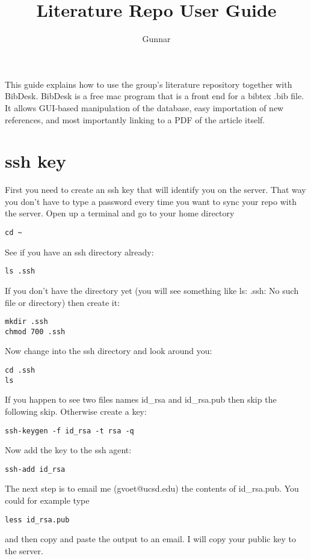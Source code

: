 \documentclass[11pt, oneside]{article}   	%
\title{Literature Repo User Guide}
\author{Gunnar}
\begin{document}
\maketitle

This guide explains how to use the group's literature repository together with BibDesk. BibDesk is a free mac program that is a front end for a bibtex .bib file.  It allows GUI-based manipulation of the database, easy importation of new references, and most importantly linking to a PDF of the article itself.

\section{ssh key}
First you need to create an ssh key that will identify you on the server. That way you don't have to type a password every time you want to sync your repo with the server. Open up a terminal and go to your home directory
\begin{verbatim}
cd ~
\end{verbatim}
See if you have an ssh directory already:
\begin{verbatim}
ls .ssh
\end{verbatim}
If you don't have the directory yet (you will see something like ls: .ssh: No such file or directory) then create it:
\begin{verbatim}
mkdir .ssh
chmod 700 .ssh
\end{verbatim}
Now change into the ssh directory and look around you:
\begin{verbatim}
cd .ssh
ls
\end{verbatim}
If you happen to see two files names id\_rsa and id\_rsa.pub then skip the following skip. Otherwise create a key:
\begin{verbatim}
ssh-keygen -f id_rsa -t rsa -q
\end{verbatim}
Now add the key to the ssh agent:
\begin{verbatim}
ssh-add id_rsa
\end{verbatim}
The next step is to email me (gvoet@ucsd.edu) the contents of id\_rsa.pub. You could for example type
\begin{verbatim}
less id_rsa.pub
\end{verbatim}
and then copy and paste the output to an email. I will copy your public key to the server.
\end{document}

